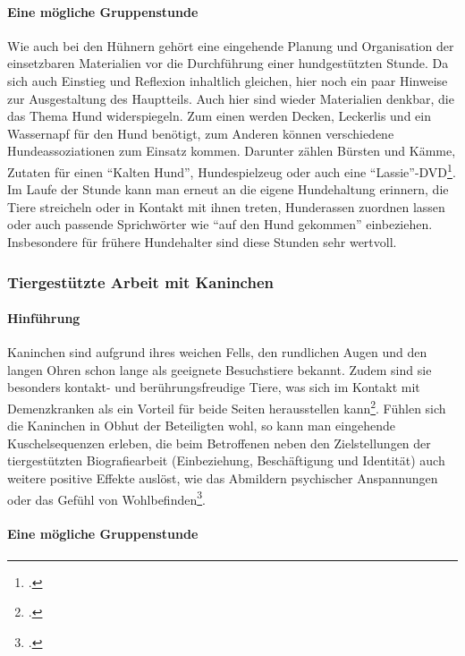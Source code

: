 \paragraph{Eine mögliche Gruppenstunde}
\label{sec:k4.3.2.2_EineMöglicheGruppenstunde}

Wie auch bei den Hühnern gehört eine eingehende Planung und Organisation der einsetzbaren Materialien vor die Durchführung einer hundgestützten Stunde. Da sich auch Einstieg und Reflexion inhaltlich gleichen, hier noch ein paar Hinweise zur Ausgestaltung des Hauptteils. Auch hier sind wieder Materialien denkbar, die das Thema Hund widerspiegeln. Zum einen werden Decken, Leckerlis und ein Wassernapf für den Hund benötigt, zum Anderen können verschiedene Hundeassoziationen zum Einsatz kommen. Darunter zählen Bürsten und Kämme, Zutaten für einen "`Kalten Hund"', Hundespielzeug oder auch eine "`Lassie"'-DVD\footcite[vgl.][106-111]{Giruc2011}. Im Laufe der Stunde kann man erneut an die eigene Hundehaltung erinnern, die Tiere streicheln oder in Kontakt mit ihnen treten, Hunderassen zuordnen lassen oder auch passende Sprichwörter wie "`auf den Hund gekommen"' einbeziehen. Insbesondere für frühere Hundehalter sind diese Stunden sehr wertvoll.

\subsubsection{Tiergestützte Arbeit mit Kaninchen}
\label{sec:k4.3.3_TiergestützteArbeitMitKaninchen}

\paragraph{Hinführung}
\label{sec:k4.3.3.1_Hinfuehrung}

Kaninchen sind aufgrund ihres weichen Fells, den rundlichen Augen und den langen Ohren schon lange als geeignete Besuchstiere bekannt. Zudem sind sie besonders kontakt- und berührungsfreudige Tiere, was sich im Kontakt mit Demenzkranken als ein Vorteil für beide Seiten herausstellen kann\footcite[vgl.][40]{Giruc2011}. Fühlen sich die Kaninchen in Obhut der Beteiligten wohl, so kann man eingehende Kuschelsequenzen erleben, die beim Betroffenen neben den Zielstellungen der tiergestützten Biografiearbeit (Einbeziehung, Beschäftigung und Identität) auch weitere positive Effekte auslöst, wie das Abmildern psychischer Anspannungen oder das Gefühl von Wohlbefinden\footcite[vgl.][74]{Leder2006}.

\paragraph{Eine mögliche Gruppenstunde}
\label{sec:k4.3.3.2_EineMöglicheGruppenstunde}

